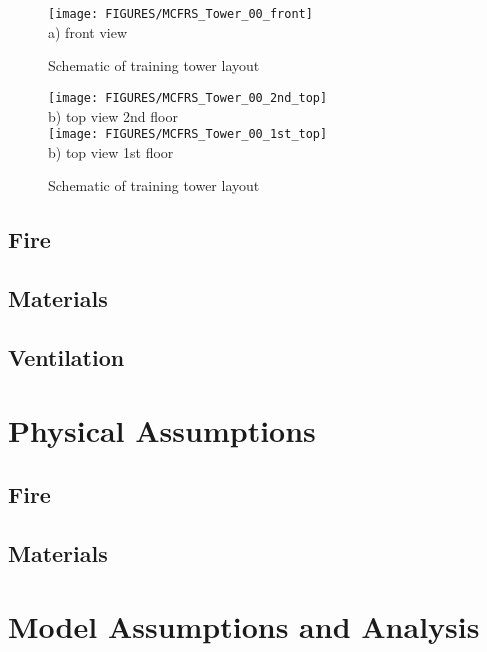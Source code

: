 \documentclass[11pt]{book}
\begin{document}
\begin{figure}[\figoptions]
\begin{center}
\texttt{[image: FIGURES/MCFRS\_Tower\_00\_front]}\\
a) front view\\
\end{center}
\caption {Schematic of training tower layout}
\label{figflashoverplan}%
\end{figure}

\begin{figure}[\figoptions]
\begin{center}
\texttt{[image: FIGURES/MCFRS\_Tower\_00\_2nd\_top]}\\
b) top view 2nd floor\\
\texttt{[image: FIGURES/MCFRS\_Tower\_00\_1st\_top]}\\
b) top view 1st floor\\
\end{center}
\caption {Schematic of training tower layout}
\label{figflashoverplan}%
\end{figure}
\subsection{Fire}

\subsection{Materials}

\subsection{Ventilation}

\section{Physical Assumptions}
\subsection{Fire}

\subsection{Materials}

\section{Model Assumptions and Analysis}
\end{document}
